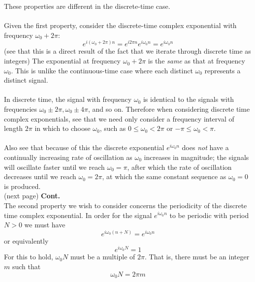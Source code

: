 \documentclass{report}
\begin{document}
These properties are different in the discrete-time case.\\
\vspace{1mm}\\
Given the first property, consider the discrete-time complex exponential with frequency $\omega_0+2\pi$:
\begin{equation*}
e^{i(\omega_0+2\pi)n}=e^{i2\pi n}e^{i\omega_0n}=e^{i\omega_0n}
\end{equation*}
(see that this is a direct result of the fact that we iterate through discrete time as integers) 
The exponential at frequency $\omega_0+2\pi$ is the \textit{same} as that at frequency $\omega_0$. 
This is unlike the continuous-time case where each distinct $\omega_0$ represents a distinct signal.\\
\vspace{1mm}\\
In discrete time, the signal with frequency $\omega_0$ is identical to the signals with frequencies 
$\omega_0\pm2\pi,\omega_0\pm4\pi$, and so on. Therefore when considering discrete time complex exponentials, 
see that we need only consider a frequency interval of length $2\pi$ in which to choose $\omega_0$, such as 
$0\leq\omega_0<2\pi$ or $-\pi\leq\omega_0<\pi$.\\
\vspace{1mm}\\
Also see that because of this the discrete exponential 
$e^{i\omega_0n}$ does \textit{not} have a continually 
increasing rate of oscillation as $\omega_0$ increases in magnitude; the signals will oscillate faster until we 
reach $\omega_0=\pi$, after which the rate of oscillation decreases until we reach $\omega_0=2\pi$, at which 
the same constant sequence as $\omega_0=0$ is produced.\\
(next page)\newpage
\noindent\textbf{Cont.}\\
The second property we wish to consider concerns the periodicity of the discrete time complex exponential. In
order for the signal $e^{i\omega_0n}$ to be periodic with
period $N>0$ we must have
\begin{equation*}
e^{i\omega_0(n+N)}=e^{i\omega_0n}
\end{equation*}
or equivalently 
\begin{equation*}
e^{i\omega_0N}=1
\end{equation*}
For this to hold, $\omega_0N$ must be a multiple of $2\pi$. That is, there must be an integer $m$ such that
\begin{equation*}
\omega_0N=2\pi m
\end{equation*}
\end{document}
